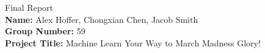 \documentclass[onecolumn, draftclsnofoot,10pt, compsoc]{IEEEtran}
\def \CapstoneTeamName{		Stat Champs}
\def \CapstoneTeamNumber{		59}
\def \GroupMemberOne{			Alex Hoffer}
\def \GroupMemberTwo{			Chongxian Chen}
\def \GroupMemberThree{			Jacob Smith}
\def \CapstoneProjectName{		Machine Learn Your Way to March Madness Glory}
\def \CapstoneSponsorCompany{	Oregon State University}
\def \CapstoneSponsorPerson{		Dr. Victor Hsu}
\def \DocType{		%
				Progress Report
				}
\newcommand{\NameSigPair}[1]{\par
\makebox[2.75in][r]{#1} \hfil 	\makebox[3.25in]{\makebox[2.25in]{\hrulefill} \hfill		\makebox[.75in]{\hrulefill}}
\par\vspace{-12pt} \textit{\tiny\noindent
\makebox[2.75in]{} \hfil		\makebox[3.25in]{\makebox[2.25in][r]{Signature} \hfill	\makebox[.75in][r]{Date}}}}
\renewcommand{\NameSigPair}[1]{#1}
\begin{document}
\begin{centering}
\huge
Final Report \\
\Large 
\textbf{Name:} Alex Hoffer, Chongxian Chen, Jacob Smith \\
\textbf{Group Number:} 59 \\
\textbf{Project Title:} Machine Learn Your Way to March Madness Glory! \\
\end{centering}
 \begin{singlespace}
      	 \begin{abstract}

\end{abstract}
\end{singlespace}
\end{document}
